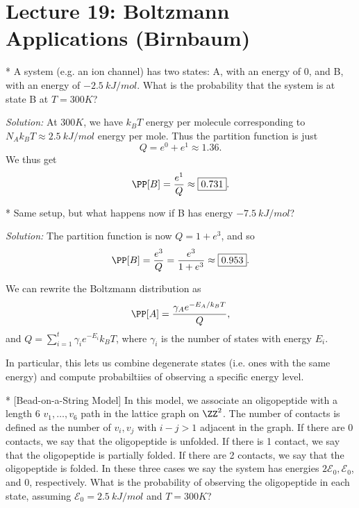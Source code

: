 \section*{Lecture 19: Boltzmann Applications (Birnbaum)}
\setcounter{section}{19}

\begin{exm}*
	A system (e.g. an ion channel) has two states: A, with an energy of $0$, and B, with an energy of $\SI{-2.5}{kJ/mol}$. What is the probability that the system is at state B at $T = \SI{300}K$?
\end{exm}	

\textit{Solution:}
At $\SI{300}K$, we have $k_BT$ energy per molecule corresponding to $N_Ak_BT \approx \SI{2.5}{kJ/mol}$ energy per mole.
Thus the partition function is just \[
	Q = e^0 + e^{1} \approx 1.36.
\]
We thus get \[
	\PP[B] = \frac{e^{1}}{Q} \approx \boxed{0.731}.
\]

\begin{exm}*
	Same setup, but what happens now if B has energy $\SI{-7.5}{kJ/mol}$?
\end{exm}

\textit{Solution:}
The partition function is now $Q = 1+e^{3}$, and so \[
	\PP[B] = \frac{e^{3}}{Q} = \frac{e^3}{1+e^3} \approx \boxed{0.953}.
\]

\begin{fact}
	We can rewrite the Boltzmann distribution as \[
		\PP[A] = \frac{\gamma_A e^{-E_A/k_BT}}{Q},
	\]
	and $Q = \sum_{i=1}^t \gamma_i e^{-E_i}{k_BT}$, where $\gamma_i$ is the number of states with energy $E_i$.
\end{fact}

In particular, this lets us combine degenerate states (i.e. ones with the same energy) and compute probabiltiies of observing a specific energy level.

\begin{exm}*
	[Bead-on-a-String Model]
	In this model, we associate an oligopeptide with a length $6$ $v_1,\ldots, v_6$ path in the lattice graph on $\ZZ^2$. The number of contacts is defined as the number of $v_i,v_j$ with $i-j > 1$ adjacent in the graph.
	If there are 0 contacts, we say that the oligopeptide is unfolded. If there is 1 contact, we say that the oligopeptide is partially folded. If there are 2 contacts, we say that the oligopeptide is folded.
	In these three cases we say the system has energies $2\mathcal E_0, \mathcal E_0$, and $0$, respectively.
	What is the probability of observing the oligopeptide in each state, assuming $\mathcal E_0 = \SI{2.5}{kJ/mol}$ and $T = \SI{300}K$?
\end{exm}

